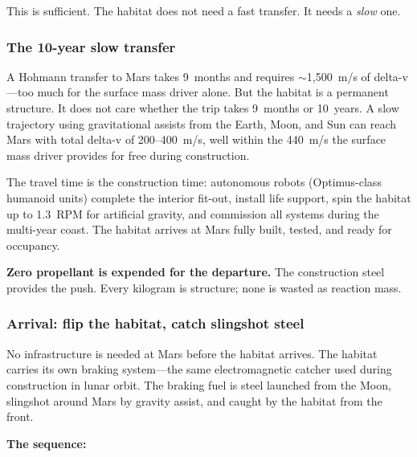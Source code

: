 \documentclass[12pt,letterpaper]{article}
\begin{document}
This is sufficient. The habitat does not need a fast transfer. It needs a \emph{slow} one.

\subsubsection{The 10-year slow transfer}

A Hohmann transfer to Mars takes 9~months and requires $\sim$1,500~m/s of delta-v---too much for the surface mass driver alone. But the habitat is a permanent structure. It does not care whether the trip takes 9~months or 10~years. A slow trajectory using gravitational assists from the Earth, Moon, and Sun can reach Mars with total delta-v of 200--400~m/s, well within the 440~m/s the surface mass driver provides for free during construction.

The travel time is the construction time: autonomous robots (Optimus-class humanoid units) complete the interior fit-out, install life support, spin the habitat up to 1.3~RPM for artificial gravity, and commission all systems during the multi-year coast. The habitat arrives at Mars fully built, tested, and ready for occupancy.

\textbf{Zero propellant is expended for the departure.} The construction steel provides the push. Every kilogram is structure; none is wasted as reaction mass.

\subsubsection{Arrival: flip the habitat, catch slingshot steel}

No infrastructure is needed at Mars before the habitat arrives. The habitat carries its own braking system---the same electromagnetic catcher used during construction in lunar orbit. The braking fuel is steel launched from the Moon, slingshot around Mars by gravity assist, and caught by the habitat from the front.

\textbf{The sequence:}
\end{document}
